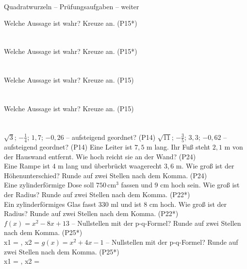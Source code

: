\begin{aufgabe}{Quadratwurzeln – Prüfungsaufgaben – weiter}
\begin{teile}
\steil Welche Aussage ist wahr? Kreuze an. \hfill (P15*)\\  \\  \\ 
\steil Welche Aussage ist wahr? Kreuze an. \hfill (P15*)\\  \\  \\ 
\teil Welche Aussage ist wahr? Kreuze an. \hfill (P15)\\  \\  \\ 
\teil Welche Aussage ist wahr? Kreuze an. \hfill (P15)\\  \\  \\ 
\teil $\sqrt{3}$; $-\frac{1}{4}$; $1{,}7$; $-0{,}26$ – aufsteigend geordnet? \hfill (P14)
\teil $\sqrt{11}$; $-\frac{3}{5}$; $3{,}3$; $-0{,}62$ – aufsteigend geordnet? \hfill (P14)
\teil Eine Leiter ist $7{,}5$ m lang. Ihr Fuß steht $2{,}1$ m von der Hauswand entfernt. Wie hoch reicht sie an der Wand? \hfill (P24) \\ \leerfeld[m]
\teil Eine Rampe ist $4$ m lang und überbrückt waagerecht $3{,}6$ m. Wie groß ist der Höhenunterschied? Runde auf zwei Stellen nach dem Komma. \hfill (P24) \\ \leerfeld[m]
\steil Eine zylinderförmige Dose soll $750\,\text{cm}^3$ fassen und $9$ cm hoch sein. Wie groß ist der Radius? Runde auf zwei Stellen nach dem Komma. \hfill (P22*) \\ \leerfeld[cm]
\steil Ein zylinderförmiges Glas fasst $330$ ml und ist $8$ cm hoch. Wie groß ist der Radius? Runde auf zwei Stellen nach dem Komma. \hfill (P22*) \\ \leerfeld[cm]
\steil $f(x) = x^2 - 8x + 13$ – Nullstellen mit der p-q-Formel? Runde auf zwei Stellen nach dem Komma. \hfill (P25*) \\ x1 = \leerfeld , x2 = \leerfeld
\steil $g(x) = x^2 + 4x - 1$ – Nullstellen mit der p-q-Formel? Runde auf zwei Stellen nach dem Komma. \hfill (P25*) \\ x1 = \leerfeld , x2 = \leerfeld
\end{teile}
\end{aufgabe}

